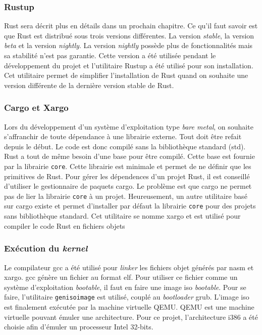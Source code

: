 \documentclass[a4paper]{article}
\begin{document}
\subsubsection{Rustup}
Rust sera décrit plus en détails dans un prochain chapitre. Ce qu'il faut savoir
est que Rust est distribué sous trois versions différentes. La version \textit{stable},
la version \textit{beta} et la version \textit{nightly}. La version \textit{nightly}
possède plus de fonctionnalités mais sa stabilité n'est pas garantie. Cette version
a été utilisée pendant le développement du projet et l'utilitaire Rustup a été utilisé
pour son installation. Cet utilitaire permet de simplifier l'installation de Rust
quand on souhaite une version différente de la dernière version stable de Rust. \\

\subsubsection{Cargo et Xargo}
Lors du développement d'un système d'exploitation type \textit{bare metal}, on souhaite
s'affranchir de toute dépendance à une librairie externe. Tout doit être refait depuis
le début. Le code est donc compilé sans la bibliothèque standard (std). Rust a tout
de même besoin d'une base pour être compilé. Cette base est fournie par la librairie
\texttt{core}. Cette librairie est minimale et permet de ne définir que
les primitives de Rust. Pour gérer les dépendences d'un projet Rust, il est conseillé
d'utiliser le gestionnaire de paquets cargo. Le problème est que cargo ne permet
pas de lier la librairie \texttt{core} à un projet. Heureusement, un 
autre utilitaire basé sur cargo existe et permet d'installer par défaut la librairie
\texttt{core} pour des projets sans bibliothèque standard. Cet utilitaire
se nomme xargo et est utilisé pour compiler le code Rust en fichiers objets \\

\subsubsection{Exécution du \textit{kernel}}
Le compilateur \acrshort{gcc} a été utilisé pour \textit{linker} les fichiers
objet générés par nasm et xargo. \acrshort{gcc} génère un fichier au format \acrshort{elf}.
Pour utiliser ce fichier comme un système d'exploitation \textit{bootable}, il faut
en faire une image \acrshort{iso} \textit{bootable}. Pour se faire, l'utilitaire
\texttt{genisoimage} est utilisé, couplé au \textit{bootloader} \acrshort{grub}.
L'image \acrshort{iso} est finalement exécutée par la machine virtuelle QEMU.
QEMU est une machine virtuelle pouvant émuler une architecture. Pour ce projet,
l'architecture i386 a été choisie afin d'émuler un processeur Intel 32-bits.
\end{document}

